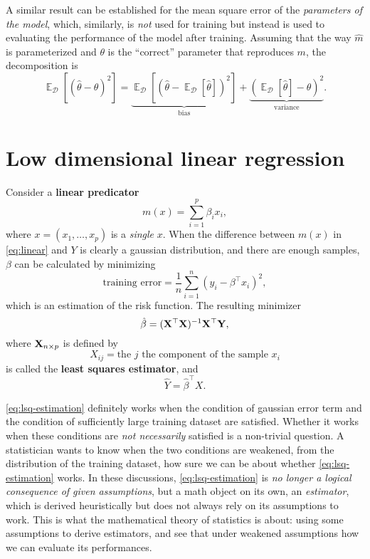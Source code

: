 \documentclass[hyperref, a4paper]{article}
\DeclareMathOperator{\expect}{\mathbb{E}}
\newcommand*{\concept}[1]{{\textbf{#1}}}
\begin{document}
A similar result can be established for the mean square error of the \emph{parameters of the model},
which, similarly, is \emph{not} used for training but instead is used to evaluating the performance of the model after training.
Assuming that the way $\hat{m}$ is parameterized and $\theta$ is the ``correct'' parameter that reproduces $m$,
the decomposition is 
\begin{equation}
    \expect_{\mathcal{D}}[(\hat{\theta} - \theta)^2] = \underbrace{\expect_{\mathcal{D}}[(\hat{\theta} - \expect_{\mathcal{D}}[\hat{\theta}])^2]}_{\text{bias}} + \underbrace{(\expect_{\mathcal{D}}[\hat{\theta}] - \theta)^2}_{\text{variance}}.
    \label{eq:theta-post-train}
\end{equation}

\section{Low dimensional linear regression}

Consider a \concept{linear predicator}
\begin{equation}
    m(x) = \sum_{i=1}^p \beta_i x_i,
    \label{eq:linear}
\end{equation}
where $x = (x_1, \ldots, x_p) $ is a \emph{single} $x$.
When the difference between $m(x)$ in \eqref{eq:linear} and $Y$ is clearly a gaussian distribution,
and there are enough samples,
$\beta$ can be calculated by minimizing 
\begin{equation}
    \text{training error} = \frac{1}{n} \sum_{i=1}^n (y_i - \beta^\top x_i)^2,
\end{equation}
which is an estimation of the risk function.
The resulting minimizer
\begin{equation}
    \hat{\beta} = (\vb{X}^\top \vb{X})^{-1} \vb{X}^\top \vb{Y},
    \label{eq:lsq-estimation}
\end{equation}
where $\vb{X}_{n \times p}$ is defined by 
\begin{equation}
    X_{ij} = \text{the $j$ the component of the sample $x_i$}
\end{equation}
is called the \concept{least squares estimator}, and 
\begin{equation}
    \hat{Y} = \hat{\beta}^\top X.
\end{equation}

\eqref{eq:lsq-estimation} definitely works when the condition of gaussian error term and 
the condition of sufficiently large training dataset are satisfied.
Whether it works when these conditions are \emph{not necessarily} satisfied is a non-trivial question.
A statistician wants to know when the two conditions are weakened,
from the distribution of the training dataset,
how sure we can be about whether \eqref{eq:lsq-estimation} works.
In these discussions, \eqref{eq:lsq-estimation} is \emph{no longer a logical consequence of given assumptions},
but a math object on its own, an \emph{estimator},
which is derived heuristically but does not always rely on its assumptions to work.
This is what the mathematical theory of statistics is about:
using some assumptions to derive estimators,
and see that under weakened assumptions how we can evaluate its performances.
\end{document}
